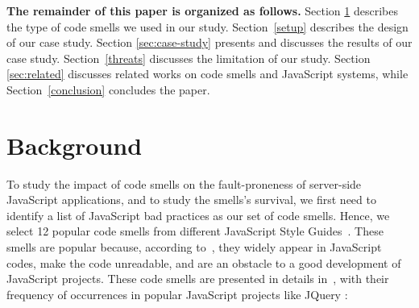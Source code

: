 \documentclass[smallcondensed]{svjour3}
\begin{document}
\textbf{The remainder of this paper is organized as follows.} Section \ref{sec:background} describes the type of code smells we used in our study.
Section~\ref{setup} describes the design of our case study. Section \ref{sec:case-study} presents and discusses the results of our case study. Section~\ref{threats} discusses the limitation of our study. Section \ref{sec:related} discusses related works on code smells and JavaScript systems, while Section~\ref{conclusion} concludes the paper.

\section{Background}\label{sec:background}

To study the impact of code smells on the fault-proneness of server-side JavaScript applications, and to study the smells's survival, we first need to identify a list of JavaScript bad practices as our set of code smells. Hence, we select 12 popular code smells from different JavaScript Style Guides~\cite{fard2013jsnose, npmjss, nodejss, airbnbjss, jqueryjss, ESLint}. {\color{blue}These smells are popular because, according to~\cite{fard2013jsnose, npmjss, nodejss, airbnbjss, jqueryjss, ESLint}, they widely appear in JavaScript codes, make the code unreadable, and are an obstacle to a good development of JavaScript projects.} %
These code smells are presented in details in~\cite{saboury2017empirical}, {\color{blue} with their frequency of occurrences in popular JavaScript projects like JQuery} :
\end{document}
